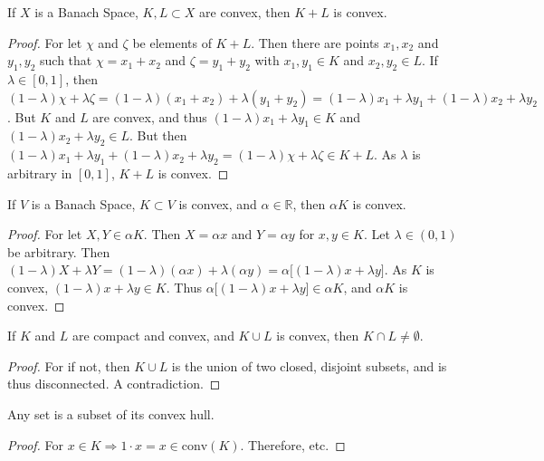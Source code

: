 \documentclass[crop=false,class=book,oneside]{standalone}
\begin{document}
            \begin{theorem}
            If $X$ is a Banach Space, $K,L\subset X$ are convex, then $K+L$ is convex.
            \end{theorem}
            \begin{proof}
            For let $\chi$ and $\zeta$ be elements of $K+L$. Then there are points $x_1,x_2$ and $y_1,y_2$ such that $\chi=x_1+x_2$ and $\zeta = y_1+y_2$ with $x_1,y_1\in K$ and $x_2,y_2\in L$. If $\lambda \in [0,1]$, then $(1-\lambda)\chi + \lambda \zeta = (1-\lambda)(x_1+x_2)+\lambda(y_1+y_2) = (1-\lambda)x_1 + \lambda y_1 + (1-\lambda)x_2 + \lambda y_2$. But $K$ and $L$ are convex, and thus $(1-\lambda)x_1 + \lambda y_1 \in K$ and $(1-\lambda)x_2 + \lambda y_2 \in L$. But then $(1-\lambda)x_1 + \lambda y_1 + (1-\lambda)x_2 + \lambda y_2=(1-\lambda)\chi + \lambda \zeta\in K+L$. As $\lambda$ is arbitrary in $[0,1]$, $K+L$ is convex.
            \end{proof}
            \begin{theorem}
            If $V$ is a Banach Space, $K\subset V$ is convex, and $\alpha \in \mathbb{R}$, then $\alpha K$ is convex.
            \end{theorem}
            \begin{proof}
            For let $X,Y\in \alpha K$. Then $X = \alpha x$ and $Y = \alpha y$ for $x,y\in K$. Let $\lambda \in (0,1)$ be arbitrary. Then $(1-\lambda)X+\lambda Y =(1-\lambda)(\alpha x)+\lambda (\alpha y) = \alpha\big[(1-\lambda)x+\lambda y\big]$. As $K$ is convex, $(1-\lambda)x+\lambda y \in K$. Thus $\alpha\big[(1-\lambda)x+\lambda y\big] \in \alpha K$, and $\alpha K$ is convex.
            \end{proof}
            \begin{theorem}
            If $K$ and $L$ are compact and convex, and $K\cup L$ is convex, then $K\cap L \ne \emptyset$.
            \end{theorem}
            \begin{proof}
            For if not, then $K\cup L$ is the union of two closed, disjoint subsets, and is thus disconnected. A contradiction. 
            \end{proof}
            \begin{lemma}
            Any set is a subset of its convex hull.
            \end{lemma}
            \begin{proof}
            For $x\in K \Rightarrow 1\cdot x=x \in \textrm{conv}(K)$. Therefore, etc.
            \end{proof}
\end{document}
